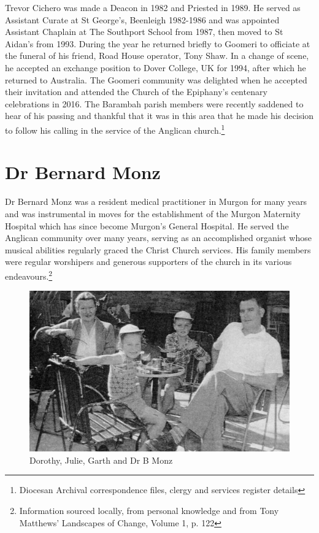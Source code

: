 Trevor Cichero was made a Deacon in 1982 and Priested in 1989. He served as Assistant Curate at St George's, Beenleigh 1982-1986 and was appointed Assistant Chaplain at The Southport School from 1987, then moved to St Aidan's from 1993. During the year he returned briefly to Goomeri to officiate at the funeral of his friend, Road House operator, Tony Shaw. In a change of scene, he accepted an exchange position to Dover College, UK for 1994, after which he returned to Australia. The Goomeri community was delighted when he accepted their invitation and attended the Church of the Epiphany's centenary celebrations in 2016. The Barambah parish members were recently saddened to hear of his passing and thankful that it was in this area that he made his decision to follow his calling in the service of the Anglican church.\footnote{Diocesan Archival correspondence files, clergy and services register details}


\section{Dr Bernard Monz}



Dr Bernard Monz was a resident medical practitioner in Murgon for many years and was instrumental in moves for the establishment of the Murgon Maternity Hospital which has since become Murgon's General Hospital. He served the Anglican community over many years, serving as an accomplished organist whose musical abilities regularly graced the Christ Church services. His family members were regular worshipers and generous supporters of the church in its various endeavours.\footnote{Information sourced locally, from personal knowledge and from Tony Matthews' Landscapes of Change, Volume 1, p. 122}








\begin{figure}
\begin{center}
\includegraphics[width=1.\linewidth,center]{../images/monz.jpg}
\caption{Dorothy, Julie, Garth and Dr B Monz}
\end{center}
\end{figure}
\balance


\printendnotes[custom]
